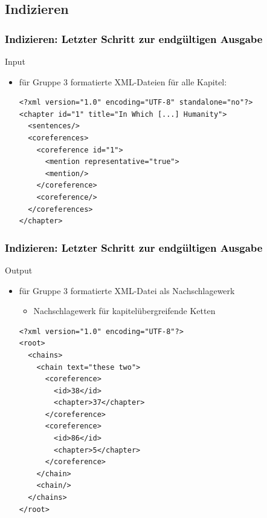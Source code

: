 \documentclass[xcolor=dvipsnames]{beamer}
\begin{document}


\subsection{Indizieren}


\begin{frame}[fragile]\frametitle{\textcolor{black}{Indizieren: Letzter Schritt zur endgültigen Ausgabe}}

\begin{block}{Input}
\begin{itemize}
\item für Gruppe 3 formatierte XML-Dateien für alle Kapitel: 
\begin{small}\begin{verbatim}
<?xml version="1.0" encoding="UTF-8" standalone="no"?>
<chapter id="1" title="In Which [...] Humanity">
  <sentences/>
  <coreferences>
    <coreference id="1">
      <mention representative="true">
      <mention/>
    </coreference>
    <coreference/>
  </coreferences>
</chapter>
\end{verbatim}
\end{small}
\end{itemize}
\end{block}

\end{frame}

\begin{frame}[fragile]\frametitle{\textcolor{black}{Indizieren: Letzter Schritt zur endgültigen Ausgabe}}

\begin{block}{Output}
\begin{itemize}
\item für Gruppe 3 formatierte XML-Datei als Nachschlagewerk
\begin{itemize}
\item Nachschlagewerk für kapitelübergreifende Ketten
\end{itemize}
\begin{small}\begin{verbatim}
<?xml version="1.0" encoding="UTF-8"?>
<root>
  <chains>
    <chain text="these two">
      <coreference>
        <id>38</id>
        <chapter>37</chapter>
      </coreference>
      <coreference>
        <id>86</id>
        <chapter>5</chapter>
      </coreference>
    </chain>
    <chain/>
  </chains>
</root>
\end{verbatim}
\end{small}
\end{itemize}
\end{block}

\end{frame}
\end{document}
